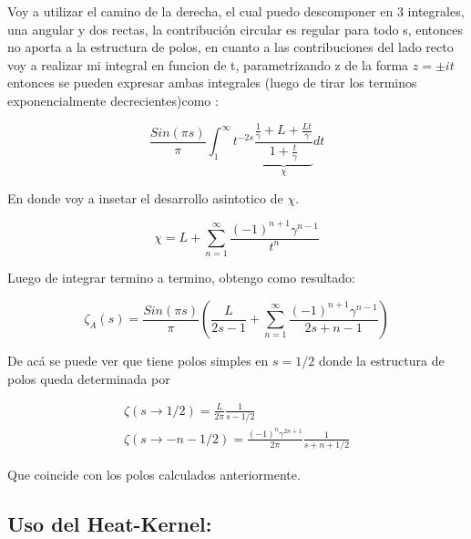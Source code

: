 Voy a utilizar el camino de la derecha, el cual puedo descomponer en 3 integrales, una angular y dos rectas, la contribución circular es regular para todo s, entonces no aporta a la estructura de polos, en cuanto a las contribuciones del lado recto voy a realizar mi integral en funcion de t, parametrizando z de la forma $z = \pm i  t$ entonces se pueden expresar ambas integrales (luego de tirar los terminos exponencialmente decrecientes)como  :

\begin{equation}
    \frac{Sin(\pi s)}{ \pi } 
    \int _1 ^{\infty} 
    t ^{-2s}
    \underbrace
    {
	\frac{ \frac{1}{\gamma} + L + \frac{L t}{\gamma}}
	{1+ \frac{t}{\gamma}}
	} _{\chi}
    dt 
\label{contorno}
\end{equation}

En donde voy a insetar el desarrollo asintotico de   $\chi$. 

\begin{equation}
    \chi = L +  \sum _{n=1} ^{\infty} \frac{(-1) ^{n+1} \gamma ^{n-1} }{t ^n}
\label{eq:chi}
\end{equation}

Luego de integrar termino a termino, obtengo como resultado:

\begin{equation}
    \zeta _A (s) = 
    \frac{Sin(\pi s)}{\pi} 
    \left(
    \frac{L}{2s-1} + 
    \sum _{n=1} ^{\infty}
    \frac{(-1) ^{n+1} \gamma ^{n-1} }{2s+n-1}
    \right)
\label{eq.zeta.com}
\end{equation}

De acá se puede ver que tiene polos simples en $s=1/2$ donde la estructura de polos queda determinada por

\begin{equation}
\begin{array}{c}

\zeta(s \rightarrow 1/2) = \frac{L}{2 \pi} \frac{1}{s-1/2} \\
\zeta (s \rightarrow -n - 1/2)  = \frac{ (-1) ^n \gamma ^{2n+1}  }{2 \pi} \frac{1}{s + n + 1/2}

\end{array}
\end{equation}


Que coincide con los polos calculados anteriormente.


\subsection{Uso del Heat-Kernel:}

